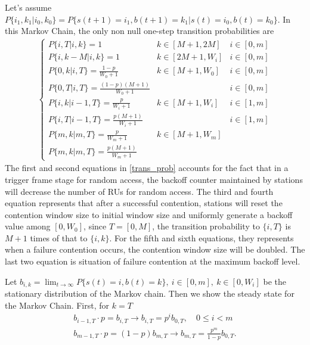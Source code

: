 Let's assume $P\lbrace i_1, k_1|i_0,k_0\rbrace = P\lbrace s(t+1) = i_1, b(t+1)= k_1|s(t) = i_0, b(t) = k_0\rbrace $. In this Markov Chain, the only non null one-step transition probabilities are 
\begin{align}
\left\lbrace
\begin{array}{lll}
P\lbrace i, T | i, k \rbrace = 1  						& k\in [M+1,2M]			& i \in [0,m]\\ [3pt]
P\lbrace i, k-M | i, k \rbrace = 1  						& k\in [2M+1,W_i]   		& i \in [0,m]\\ [3pt]
P\lbrace 0, k | i, T \rbrace = \frac{1-p}{W_0+1}  		& k\in [M+1,W_0]			& i \in [0,m]\\ [3pt]
P\lbrace 0, T | i, T \rbrace = \frac{(1-p)(M+1)}{W_0+1}  &						& i \in [0,m]\\ [3pt]
P\lbrace i, k | i-1, T \rbrace = \frac{p}{W_i+1} 		& k\in [M+1,W_i] 		& i \in [1,m]\\ [3pt]
P\lbrace i, T | i-1, T \rbrace = \frac{p(M+1)}{W_i+1}    &  						& i \in [1,m]\\ [3pt]
P\lbrace m, k | m, T \rbrace = \frac{p}{W_m+1} 		 	& k\in [M+1,W_m] 		& \\ [3pt]
P\lbrace m, k | m, T \rbrace = \frac{p(M+1)}{W_m+1}
\end{array}
\right.
\label{trans_prob}
\end{align}
The first and second equations in \ref{trans_prob} accounts for the fact that in a trigger frame stage for random access, the backoff counter maintained by stations will decrease the number of RUs for random access. 
The third and fourth equation represents that after a successful contention, stations will reset the contention window size to initial window size and uniformly generate a backoff value among $[0,W_0]$, since $T = [0,M]$, the transition probability to $\lbrace i, T \rbrace$ is $M+1$ times of that to $\lbrace i, k \rbrace$. 
For the fifth and sixth equations, they represents when a failure contention occurs, the contention window size will be doubled. 
The last two equation is situation of failure contention at the maximum backoff level.

Let $b_{i,k} = \lim_{t\rightarrow \infty} P\lbrace s(t) = i, b(t) = k\rbrace,\ i\in [0,m], \ k \in [0,W_i]$ be the stationary distribution of the Markov chain. Then we show the steady state for the Markov Chain.
First,  for $k = T$
\begin{align}
b_{i-1,T}\cdot p = b_{i,T} 		\rightarrow b_{i,T} = p^i b_{0,T}, \quad 0\leq i < m\\
b_{m-1,T}\cdot p = (1-p) b_{m,T}	\rightarrow b_{m,T} = \frac{p^m}{1-p}b_{0,T}.
\label{biT}
\end{align}

